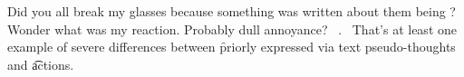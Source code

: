 Did you all break my glasses because something was written about them being ? Wonder what was my reaction. Probably dull annoyance? \hatr\ . \haty\ That's at least one example of severe differences between \f{priorly expressed via text pseudo-thoughts} and \t{actions}.
